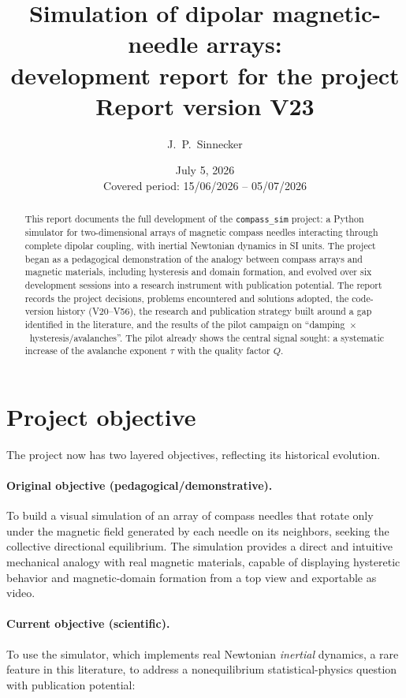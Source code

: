 \documentclass[11pt,a4paper]{article}
\title{\textbf{Simulation of dipolar magnetic-needle arrays:\\
development report for the \code{compass\_sim} project}\\[1ex]
\large Report version V23}
\author{J.~P.~Sinnecker}
\date{July 5, 2026\\[0.5ex]
\small Covered period: 15/06/2026 -- 05/07/2026}
\newcommand{\code}[1]{\texttt{#1}}
\begin{document}
\maketitle

\begin{abstract}
\noindent
This report documents the full development of the \code{compass\_sim} project: a Python simulator for two-dimensional arrays of magnetic compass needles interacting through complete dipolar coupling, with inertial Newtonian dynamics in SI units. The project began as a pedagogical demonstration of the analogy between compass arrays and magnetic materials, including hysteresis and domain formation, and evolved over six development sessions into a research instrument with publication potential. The report records the project decisions, problems encountered and solutions adopted, the code-version history (V20--V56), the research and publication strategy built around a gap identified in the literature, and the results of the pilot campaign on ``damping~$\times$~hysteresis/avalanches''. The pilot already shows the central signal sought: a systematic increase of the avalanche exponent $\tau$ with the quality factor $Q$.
\end{abstract}

\tableofcontents
\newpage

\section{Project objective}

The project now has two layered objectives, reflecting its historical evolution.

\paragraph{Original objective (pedagogical/demonstrative).}
To build a visual simulation of an array of compass needles that rotate only under the magnetic field generated by each needle on its neighbors, seeking the collective directional equilibrium. The simulation provides a direct and intuitive mechanical analogy with real magnetic materials, capable of displaying hysteretic behavior and magnetic-domain formation from a top view and exportable as video.

\paragraph{Current objective (scientific).}
To use the simulator, which implements real Newtonian \emph{inertial} dynamics, a rare feature in this literature, to address a nonequilibrium statistical-physics question with publication potential:
\end{document}
